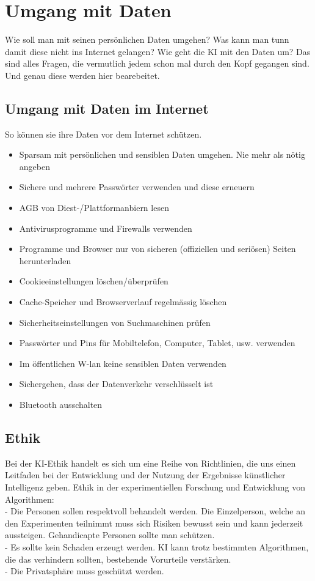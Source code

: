 \chapter{Umgang mit Daten}
\label{chap:daten}

Wie soll man mit seinen persönlichen Daten umgehen? Was kann man tunn damit diese nicht ins Internet gelangen? Wie geht die KI mit den Daten um?
Das  sind alles Fragen, die vermutlich jedem schon mal durch den Kopf gegangen sind. Und genau diese werden hier bearebeitet.

\section{Umgang mit Daten im Internet}
So können sie ihre Daten vor dem Internet schützen.

\begin{itemize}
    \item Sparsam mit persönlichen und sensiblen Daten umgehen. Nie mehr als nötig angeben
    \item Sichere und mehrere Passwörter verwenden und diese erneuern
    \item AGB von Diest-/Plattformanbiern lesen
    \item Antivirusprogramme und Firewalls verwenden
    \item Programme und Browser nur von sicheren (offiziellen und seriösen) Seiten herunterladen
    \item Cookieeinstellungen löschen/überprüfen
    \item Cache-Speicher und Browserverlauf regelmässig löschen
    \item Sicherheitseinstellungen von Suchmaschinen prüfen
    \item Passwörter und Pins für Mobiltelefon, Computer, Tablet, usw. verwenden
    \item Im öffentlichen W-lan keine sensiblen Daten verwenden
    \item Sichergehen, dass der Datenverkehr verschlüsselt ist
    \item Bluetooth ausschalten
\end{itemize}
\citep{datenschutz}

\section{Ethik}
Bei der KI-Ethik handelt es sich um eine Reihe von Richtlinien, die uns einen Leitfaden bei der Entwicklung und der Nutzung der Ergebnisse künstlicher Intelligenz geben.
\bigskip
Ethik in der experimentiellen Forschung und Entwicklung von Algorithmen:\\
- Die Personen sollen respektvoll behandelt werden. Die Einzelperson, welche an den Experimenten teilnimmt muss sich Risiken bewusst sein und kann jederzeit aussteigen. Gehandicapte Personen sollte man schützen.\\
- Es sollte kein Schaden erzeugt werden. KI kann trotz bestimmten Algorithmen, die das verhindern sollten, bestehende Vorurteile verstärken.\\
- Die Privatsphäre muss geschützt werden.\\
\citep{ibm}
